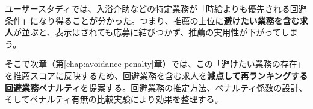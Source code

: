 ユーザースタディでは、入浴介助などの特定業務が「時給よりも優先される回避条件」になり得ることが分かった。つまり、推薦の上位に\textbf{避けたい業務を含む求人}が並ぶと、表示はされても応募に結びつかず、推薦の実用性が下がってしまう。

そこで次章（第\ref{chap:avoidance-penalty}章）では、この「避けたい業務の存在」を推薦スコアに反映するため、回避業務を含む求人を\textbf{減点して再ランキングする回避業務ペナルティ}を提案する。回避業務の推定方法、ペナルティ係数の設計、そしてペナルティ有無の比較実験により効果を整理する。
